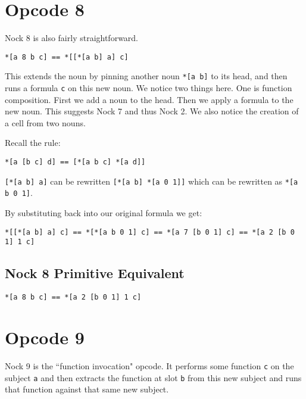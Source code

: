 \documentclass[twoside]{article}
\begin{document}
\section{Opcode 8}

Nock 8 is also fairly straightforward.

\begin{lstlisting}[style=listingblock]
*[a 8 b c] == *[[*[a b] a] c]
\end{lstlisting}

This extends the noun by pinning another noun \lstinline[style=inlinecode]{*[a b]} to its head, and then runs a formula \lstinline[style=inlinecode]{c} on this new noun. We notice two things here. One is function composition. First we add a noun to the head. Then we apply a formula to the new noun. This suggests Nock 7 and thus Nock 2. We also notice the creation of a cell from two nouns.

Recall the rule:

\begin{lstlisting}[style=listingblock]
*[a [b c] d] == [*[a b c] *[a d]]
\end{lstlisting}

\noindent
\lstinline[style=inlinecode]{[*[a b] a]} can be rewritten \lstinline[style=inlinecode]{[*[a b] *[a 0 1]]} which can be rewritten as \lstinline[style=inlinecode]{*[a b 0 1]}.

By substituting back into our original formula we get:

\begin{lstlisting}[style=listingblock]
*[[*[a b] a] c] == *[*[a b 0 1] c] == *[a 7 [b 0 1] c] == *[a 2 [b 0 1] 1 c]
\end{lstlisting}

\subsection{Nock 8 Primitive Equivalent}

\begin{lstlisting}[style=listingblock]
*[a 8 b c] == *[a 2 [b 0 1] 1 c]
\end{lstlisting}

\section{Opcode 9}

Nock 9 is the ``function invocation" opcode. It performs some function \lstinline[style=inlinecode]{c} on the subject \lstinline[style=inlinecode]{a} and then extracts the function at slot \lstinline[style=inlinecode]{b} from this new subject and runs that function against that same new subject.
\end{document}
